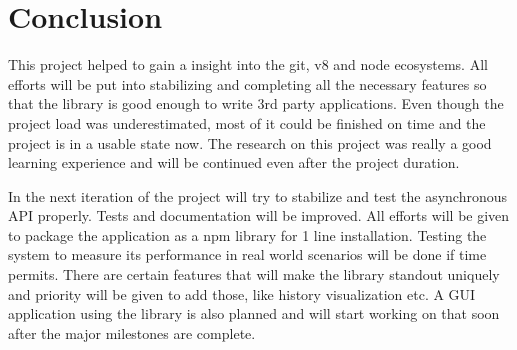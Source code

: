 \chapter{Conclusion}

This project helped to gain a insight into the git, v8 and node ecosystems. All
efforts will be put into stabilizing and completing all the necessary features
so that the library is good enough to write 3rd party applications. Even though
the project load was underestimated, most of it could be finished on time and
the project is in a usable state now. The research on this project was really a
good learning experience and will be continued even after the project duration.

In the next iteration of the project will try to stabilize and test the
asynchronous API properly. Tests and documentation will be improved. All efforts
will be given to package the application as a npm library for 1 line
installation. Testing the system to measure its performance in real world
scenarios will be done if time permits. There are certain features that will
make the library standout uniquely and priority will be given to add those, like
history visualization etc. A GUI application using the library is also planned
and will start working on that soon after the major milestones are complete.
